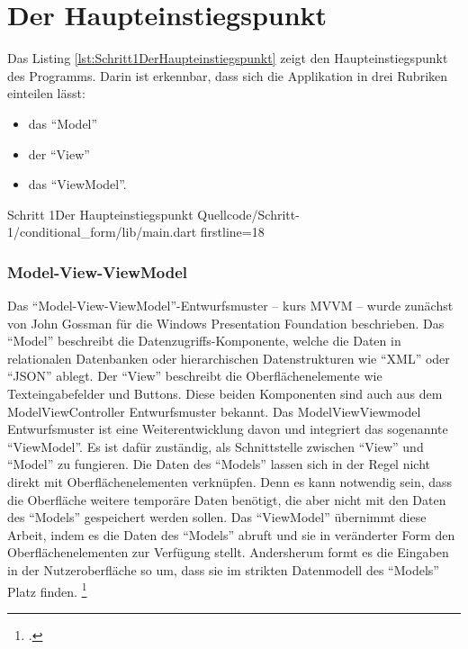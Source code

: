 

\section{Der Haupteinstiegspunkt}

Das Listing \ref{lst:Schritt1DerHaupteinstiegspunkt} zeigt den Haupteinstiegspunkt des Programms.
Darin ist erkennbar, dass sich die Applikation in drei Rubriken einteilen lässt:
\begin{itemize}
  \item das \enquote{Model} 
  \item der \enquote{View} 
  \item das \enquote{ViewModel}. 
\end{itemize}

\begin{alexlisting}{Schritt 1}{Der Haupteinstiegspunkt}
  {Quellcode/Schritt-1/conditional_form/lib/main.dart}
  {firstline=18}
  \label{lst:Schritt1DerHaupteinstiegspunkt}
\end{alexlisting}

\subsubsection{Model-View-ViewModel}
Das \enquote{Model-View-ViewModel}-Entwurfsmuster -- kurs MVVM -- wurde zunächst von John Gossman für die Windows Presentation Foundation beschrieben.
Das \enquote{Model} beschreibt die Datenzugriffs-Komponente, welche die Daten in relationalen Datenbanken oder hierarchischen Datenstrukturen wie \enquote{XML} oder \enquote{JSON} ablegt.
Der \enquote{View} beschreibt die Oberflächenelemente wie Texteingabefelder und Buttons.
Diese beiden Komponenten sind auch aus dem ModelViewController Entwurfsmuster bekannt.
Das ModelViewViewmodel Entwurfsmuster ist eine Weiterentwicklung davon und integriert das sogenannte \enquote{ViewModel}.
Es ist dafür zuständig, als Schnittstelle zwischen \enquote{View} und \enquote{Model} zu fungieren.
Die Daten des \enquote{Models} lassen sich in der Regel nicht direkt mit Oberflächenelementen verknüpfen.
Denn es kann notwendig sein, dass die Oberfläche weitere temporäre Daten benötigt, die aber nicht mit den Daten des \enquote{Models} gespeichert werden sollen.
Das \enquote{ViewModel} übernimmt diese Arbeit, indem es die Daten des \enquote{Models} abruft und sie in veränderter Form den Oberflächenelementen zur Verfügung stellt.
Andersherum formt es die Eingaben in der Nutzeroberfläche so um, dass sie im strikten Datenmodell des \enquote{Models} Platz finden.
\footcite[Vgl.][]{IntroductionToModelViewViewModelPatternForBuildingWPFApps}

